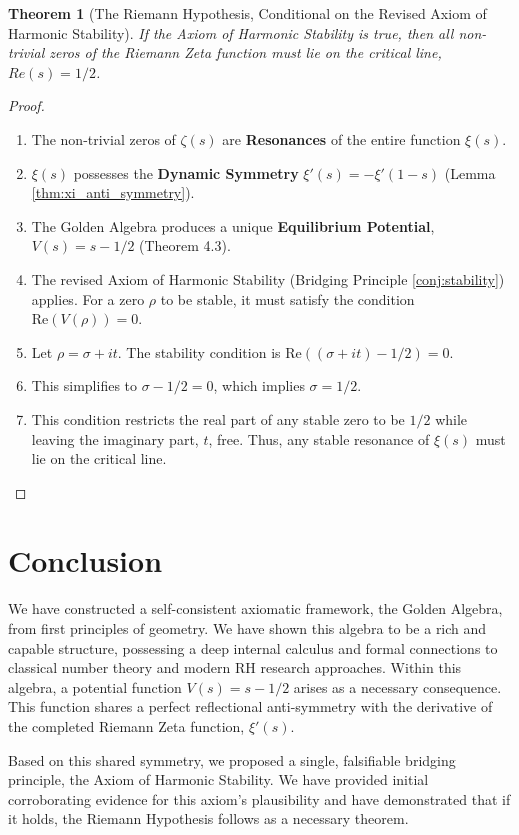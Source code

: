 \documentclass{article}
\theoremstyle{plain}
\newtheorem{theorem}{Theorem}[section]
\theoremstyle{definition}
\theoremstyle{remark}
\begin{document}
\begin{theorem}[The Riemann Hypothesis, Conditional on the Revised Axiom of Harmonic Stability]
If the Axiom of Harmonic Stability is true, then all non-trivial zeros of the Riemann Zeta function must lie on the critical line, $Re(s)=1/2$.
\end{theorem}
\begin{proof}
\begin{enumerate}
    \item The non-trivial zeros of $\zeta(s)$ are \textbf{Resonances} of the entire function $\xi(s)$.
    \item $\xi(s)$ possesses the \textbf{Dynamic Symmetry} $\xi'(s) = -\xi'(1-s)$ (Lemma \ref{thm:xi_anti_symmetry}).
    \item The Golden Algebra produces a unique \textbf{Equilibrium Potential}, $V(s) = s - 1/2$ (Theorem 4.3).
    \item The revised Axiom of Harmonic Stability (Bridging Principle \ref{conj:stability}) applies. For a zero $\rho$ to be stable, it must satisfy the condition $\text{Re}(V(\rho))=0$.
    \item Let $\rho = \sigma + it$. The stability condition is $\text{Re}((\sigma + it) - 1/2) = 0$.
    \item This simplifies to $\sigma - 1/2 = 0$, which implies $\sigma = 1/2$.
    \item This condition restricts the real part of any stable zero to be $1/2$ while leaving the imaginary part, $t$, free. Thus, any stable resonance of $\xi(s)$ must lie on the critical line.
\end{enumerate}
\end{proof}

\section{Conclusion}
We have constructed a self-consistent axiomatic framework, the Golden Algebra, from first principles of geometry. We have shown this algebra to be a rich and capable structure, possessing a deep internal calculus and formal connections to classical number theory and modern RH research approaches. Within this algebra, a potential function $V(s) = s - 1/2$ arises as a necessary consequence. This function shares a perfect reflectional anti-symmetry with the derivative of the completed Riemann Zeta function, $\xi'(s)$.

Based on this shared symmetry, we proposed a single, falsifiable bridging principle, the Axiom of Harmonic Stability. We have provided initial corroborating evidence for this axiom's plausibility and have demonstrated that if it holds, the Riemann Hypothesis follows as a necessary theorem.
\end{document}
